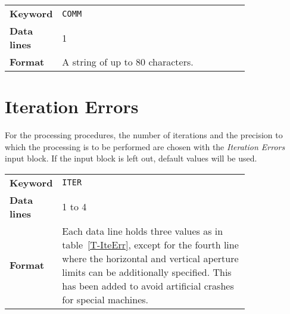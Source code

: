 \bigskip
\begin{tabular}{@{}lp{0.8\linewidth}}
    \textbf{Keyword}    & \texttt{COMM}\index{COMM}\index{comment} \\
    \textbf{Data lines} & 1 \\
    \textbf{Format}     & A string of up to 80 characters.
\end{tabular}

\section{Iteration Errors} \label{IteErr}

For the processing procedures, the number of iterations and the precision to which the processing is to be performed are chosen with the \textit{Iteration Errors} input block.
If the input block is left out, default values will be used.

\bigskip
\begin{tabular}{@{}lp{0.8\linewidth}}
    \textbf{Keyword}    & \texttt{ITER}\index{ITER} \\
    \textbf{Data lines} & 1 to 4 \\
    \textbf{Format}     & Each data line holds three values as in table~\ref{T-IteErr}, except for the fourth line where the horizontal and vertical aperture limits can be additionally specified. This has been added to avoid artificial crashes for special machines.
\end{tabular}

